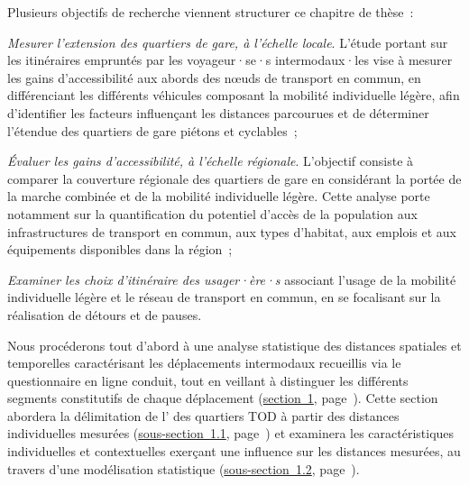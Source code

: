 \begin{refsegment}
Plusieurs objectifs de recherche viennent structurer ce chapitre de thèse~:
\begin{customitemize}
    \item \textsl{Mesurer l'extension des quartiers de gare, à l'échelle locale}. L'étude portant sur les itinéraires empruntés par les voyageur·se·s intermodaux·les vise à mesurer les gains d'accessibilité aux abords des nœuds de transport en commun, en différenciant les différents véhicules composant la mobilité individuelle légère, afin d'identifier les facteurs influençant les distances parcourues et de déterminer l'étendue des quartiers de gare piétons et cyclables~;
    \item \textsl{Évaluer les gains d'accessibilité, à l'échelle régionale}. L'objectif consiste à comparer la couverture régionale des quartiers de gare en considérant la portée de la marche combinée et de la mobilité individuelle légère. Cette analyse porte notamment sur la quantification du potentiel d'accès de la population aux infrastructures de transport en commun, aux types d'habitat, aux emplois et aux équipements disponibles dans la région~;
    \item \textsl{Examiner les choix d'itinéraire des usager·ère·s} associant l'usage de la mobilité individuelle légère et le réseau de transport en commun, en se focalisant sur la réalisation de détours et de pauses.
\end{customitemize}%

Nous procéderons tout d'abord à une analyse statistique des distances spatiales et temporelles caractérisant les déplacements intermodaux recueillis via le questionnaire en ligne conduit, tout en veillant à distinguer les différents segments constitutifs de chaque \gls{déplacement} (\hyperref[chap5:aire-secondaire-quartier-gare]{section~1}, page~\pageref{chap5:aire-secondaire-quartier-gare}). Cette section abordera la délimitation de l' des quartiers \acrshort{TOD} à partir des distances individuelles mesurées (\hyperref[chap5:aire-cyclable-micromobilite]{sous-section~1.1}, page~\pageref{chap5:aire-cyclable-micromobilite}) et examinera les caractéristiques individuelles et contextuelles exerçant une influence sur les distances mesurées, au travers d'une modélisation statistique (\hyperref[chap5:regression-distances]{sous-section~1.2}, page~\pageref{chap5:regression-distances}).%


\end{refsegment}

